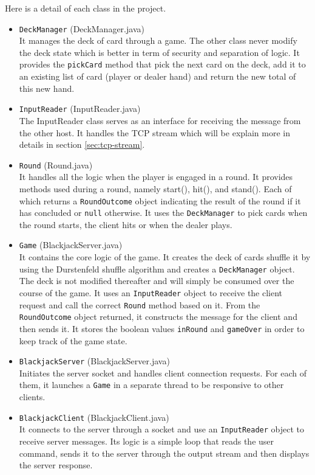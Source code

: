 \documentclass[11pt]{article}
\begin{document}
Here is a detail of each class in the project.
\begin{itemize}
    \item \texttt{DeckManager} (DeckManager.java)\\
        It manages the deck of card through a game. The other class never modify the deck state which is better in term of security and separation of logic.
        It provides the \texttt{pickCard} method that pick the next card on the deck, add it to an existing list of card (player or dealer hand) and return the new total of this new hand.

    \item \texttt{InputReader} (InputReader.java)\\
        The InputReader class serves as an interface for receiving the message from the other host. It handles the TCP stream which will be explain more in details in section \ref{sec:tcp-stream}.

    \item \texttt{Round} (Round.java)\\
        It handles all the logic when the player is engaged in a round. It provides methods used during a round, namely start(), hit(), and stand(). Each of which returns a \texttt{RoundOutcome} object indicating the result of the round if it has concluded or \texttt{null} otherwise. It uses the \texttt{DeckManager} to pick cards when the round starts, the client hits or when the dealer plays.

    \item \texttt{Game} (BlackjackServer.java)\\
        It contains the core logic of the game. It creates the deck of cards shuffle it by using the Durstenfeld shuffle algorithm and creates a \texttt{DeckManager} object. The deck is not modified thereafter and will simply be consumed over the course of the game. It uses an \texttt{InputReader} object to receive the client request and call the correct \texttt{Round} method based on it. From the \texttt{RoundOutcome} object returned, it constructs the message for the client and then sends it. It stores the boolean values \texttt{inRound} and \texttt{gameOver} in order to keep track of the game state.

    \item \texttt{BlackjackServer} (BlackjackServer.java)\\
        Initiates the server socket and handles client connection requests. For each of them, it launches a \texttt{Game} in a separate thread to be responsive to other clients.

    \item \texttt{BlackjackClient} (BlackjackClient.java)\\
        It connects to the server through a socket and use an \texttt{InputReader} object to receive server messages. Its logic is a simple loop that reads the user command, sends it to the server through the output stream and then displays the server response.

\end{itemize}   
\end{document}
